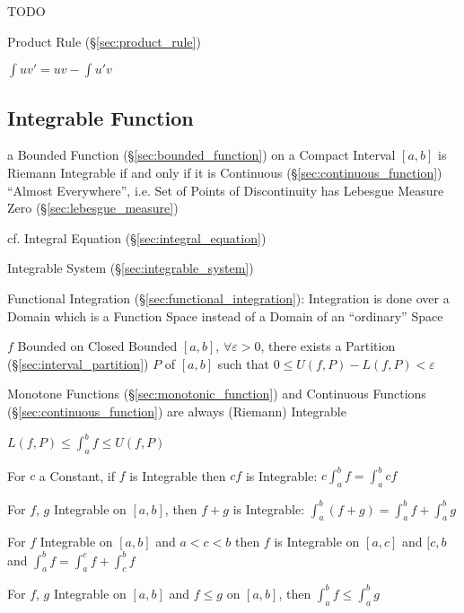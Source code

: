 TODO

\fist Product Rule (\S\ref{sec:product_rule})

$\int{uv'} = uv - \int{u'v}$



\subsection{Integrable Function}\label{sec:integrable_function}


a Bounded Function (\S\ref{sec:bounded_function}) on a Compact Interval $[a,b]$
is Riemann Integrable if and only if it is Continuous
(\S\ref{sec:continuous_function}) ``Almost Everywhere'', i.e. Set of Points of
Discontinuity has Lebesgue Measure Zero (\S\ref{sec:lebesgue_measure})

cf. Integral Equation (\S\ref{sec:integral_equation})

\fist Integrable System (\S\ref{sec:integrable_system})

\fist Functional Integration (\S\ref{sec:functional_integration}): Integration
is done over a Domain which is a Function Space instead of a Domain of an
``ordinary'' Space

$f$ Bounded on Closed Bounded $[a,b]$, $\forall \varepsilon >0$, there
exists a Partition (\S\ref{sec:interval_partition}) $P$ of $[a,b]$
such that $0 \leq U(f,P) - L(f,P) < \varepsilon$ %

Monotone Functions (\S\ref{sec:monotonic_function}) and Continuous
Functions (\S\ref{sec:continuous_function}) are always (Riemann)
Integrable

$L(f,P) \leq \int_a^b f \leq U(f,P)$

For $c$ a Constant, if $f$ is Integrable then $cf$ is Integrable: $c
\int_a^b f = \int_a^b c f$

For $f$, $g$ Integrable on $[a,b]$, then $f + g$ is Integrable:
$\int_a^b (f+g) = \int_a^b f + \int_a^b g$

For $f$ Integrable on $[a,b]$ and $a < c < b$ then $f$ is Integrable
on $[a,c]$ and $[c,b$ and $\int_a^b f = \int_a^c f + \int_c^b f$

For $f$, $g$ Integrable on $[a,b]$ and $f \leq g$ on $[a,b]$, then
$\int_a^b f \leq \int_a^b g$

